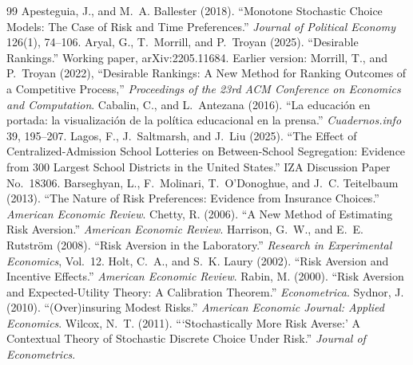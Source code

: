\documentclass{article}
\begin{document}
\begin{thebibliography}{99}
 Apesteguia, J., and M.~A. Ballester (2018). ``Monotone Stochastic Choice Models: The Case of Risk and Time Preferences.'' \emph{Journal of Political Economy} 126(1), 74--106.
 Aryal, G., T.~Morrill, and P.~Troyan (2025). ``Desirable Rankings.'' Working paper, arXiv:2205.11684. Earlier version: Morrill, T., and P.~Troyan (2022), ``Desirable Rankings: A New Method for Ranking Outcomes of a Competitive Process,'' \emph{Proceedings of the 23rd ACM Conference on Economics and Computation}.
 Cabalin, C., and L.~Antezana (2016). ``La educaci\'{o}n en portada: la visualizaci\'{o}n de la pol\'{i}tica educacional en la prensa.'' \emph{Cuadernos.info} 39, 195--207.
 Lagos, F., J.~Saltmarsh, and J.~Liu (2025). ``The Effect of Centralized-Admission School Lotteries on Between-School Segregation: Evidence from 300 Largest School Districts in the United States.'' IZA Discussion Paper No.~18306.
 Barseghyan, L., F.~Molinari, T.~O'Donoghue, and J.~C. Teitelbaum (2013). ``The Nature of Risk Preferences: Evidence from Insurance Choices.'' \emph{American Economic Review}.
 Chetty, R. (2006). ``A New Method of Estimating Risk Aversion.'' \emph{American Economic Review}.
 Harrison, G.~W., and E.~E. Rutstr\"om (2008). ``Risk Aversion in the Laboratory.'' \emph{Research in Experimental Economics}, Vol.~12.
 Holt, C.~A., and S.~K. Laury (2002). ``Risk Aversion and Incentive Effects.'' \emph{American Economic Review}.
 Rabin, M. (2000). ``Risk Aversion and Expected-Utility Theory: A Calibration Theorem.'' \emph{Econometrica}.
 Sydnor, J. (2010). ``(Over)insuring Modest Risks.'' \emph{American Economic Journal: Applied Economics}.
 Wilcox, N.~T. (2011). ```Stochastically More Risk Averse:' A Contextual Theory of Stochastic Discrete Choice Under Risk.'' \emph{Journal of Econometrics}.
\end{thebibliography}
\end{document}
